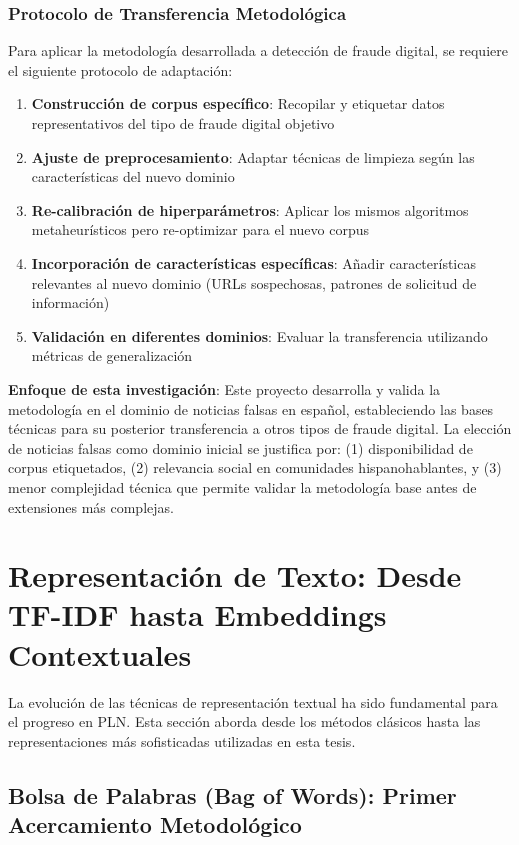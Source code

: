 \subsubsection{Protocolo de Transferencia Metodológica}

Para aplicar la metodología desarrollada a detección de fraude digital, se requiere el siguiente protocolo de adaptación:

\begin{enumerate}
    \item \textbf{Construcción de corpus específico}: Recopilar y etiquetar datos representativos del tipo de fraude digital objetivo
    \item \textbf{Ajuste de preprocesamiento}: Adaptar técnicas de limpieza según las características del nuevo dominio
    \item \textbf{Re-calibración de hiperparámetros}: Aplicar los mismos algoritmos metaheurísticos pero re-optimizar para el nuevo corpus
    \item \textbf{Incorporación de características específicas}: Añadir características relevantes al nuevo dominio (URLs sospechosas, patrones de solicitud de información)
    \item \textbf{Validación en diferentes dominios}: Evaluar la transferencia utilizando métricas de generalización
\end{enumerate}

\textbf{Enfoque de esta investigación}: Este proyecto desarrolla y valida la metodología en el dominio de noticias falsas en español, estableciendo las bases técnicas para su posterior transferencia a otros tipos de fraude digital. La elección de noticias falsas como dominio inicial se justifica por: (1) disponibilidad de corpus etiquetados, (2) relevancia social en comunidades hispanohablantes, y (3) menor complejidad técnica que permite validar la metodología base antes de extensiones más complejas.

\section{Representación de Texto: Desde TF-IDF hasta Embeddings Contextuales}
\label{sec:representacion_texto}

La evolución de las técnicas de representación textual ha sido fundamental para el progreso en PLN. Esta sección aborda desde los métodos clásicos hasta las representaciones más sofisticadas utilizadas en esta tesis.

\subsection{Bolsa de Palabras (Bag of Words): Primer Acercamiento Metodológico}

